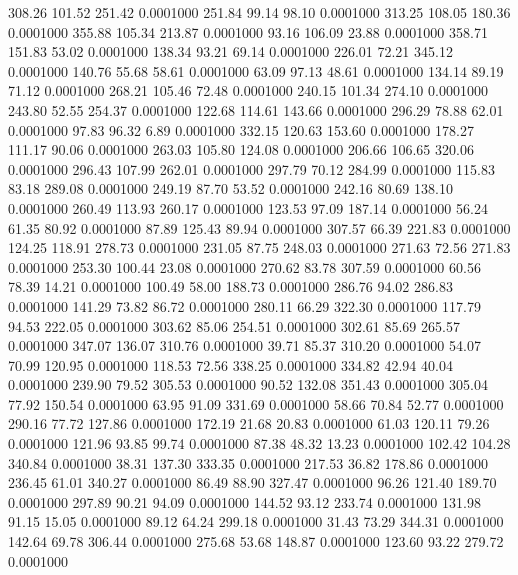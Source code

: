  308.26  101.52  251.42   0.0001000
 251.84   99.14   98.10   0.0001000
 313.25  108.05  180.36   0.0001000
 355.88  105.34  213.87   0.0001000
  93.16  106.09   23.88   0.0001000
 358.71  151.83   53.02   0.0001000
 138.34   93.21   69.14   0.0001000
 226.01   72.21  345.12   0.0001000
 140.76   55.68   58.61   0.0001000
  63.09   97.13   48.61   0.0001000
 134.14   89.19   71.12   0.0001000
 268.21  105.46   72.48   0.0001000
 240.15  101.34  274.10   0.0001000
 243.80   52.55  254.37   0.0001000
 122.68  114.61  143.66   0.0001000
 296.29   78.88   62.01   0.0001000
  97.83   96.32    6.89   0.0001000
 332.15  120.63  153.60   0.0001000
 178.27  111.17   90.06   0.0001000
 263.03  105.80  124.08   0.0001000
 206.66  106.65  320.06   0.0001000
 296.43  107.99  262.01   0.0001000
 297.79   70.12  284.99   0.0001000
 115.83   83.18  289.08   0.0001000
 249.19   87.70   53.52   0.0001000
 242.16   80.69  138.10   0.0001000
 260.49  113.93  260.17   0.0001000
 123.53   97.09  187.14   0.0001000
  56.24   61.35   80.92   0.0001000
  87.89  125.43   89.94   0.0001000
 307.57   66.39  221.83   0.0001000
 124.25  118.91  278.73   0.0001000
 231.05   87.75  248.03   0.0001000
 271.63   72.56  271.83   0.0001000
 253.30  100.44   23.08   0.0001000
 270.62   83.78  307.59   0.0001000
  60.56   78.39   14.21   0.0001000
 100.49   58.00  188.73   0.0001000
 286.76   94.02  286.83   0.0001000
 141.29   73.82   86.72   0.0001000
 280.11   66.29  322.30   0.0001000
 117.79   94.53  222.05   0.0001000
 303.62   85.06  254.51   0.0001000
 302.61   85.69  265.57   0.0001000
 347.07  136.07  310.76   0.0001000
  39.71   85.37  310.20   0.0001000
  54.07   70.99  120.95   0.0001000
 118.53   72.56  338.25   0.0001000
 334.82   42.94   40.04   0.0001000
 239.90   79.52  305.53   0.0001000
  90.52  132.08  351.43   0.0001000
 305.04   77.92  150.54   0.0001000
  63.95   91.09  331.69   0.0001000
  58.66   70.84   52.77   0.0001000
 290.16   77.72  127.86   0.0001000
 172.19   21.68   20.83   0.0001000
  61.03  120.11   79.26   0.0001000
 121.96   93.85   99.74   0.0001000
  87.38   48.32   13.23   0.0001000
 102.42  104.28  340.84   0.0001000
  38.31  137.30  333.35   0.0001000
 217.53   36.82  178.86   0.0001000
 236.45   61.01  340.27   0.0001000
  86.49   88.90  327.47   0.0001000
  96.26  121.40  189.70   0.0001000
 297.89   90.21   94.09   0.0001000
 144.52   93.12  233.74   0.0001000
 131.98   91.15   15.05   0.0001000
  89.12   64.24  299.18   0.0001000
  31.43   73.29  344.31   0.0001000
 142.64   69.78  306.44   0.0001000
 275.68   53.68  148.87   0.0001000
 123.60   93.22  279.72   0.0001000
